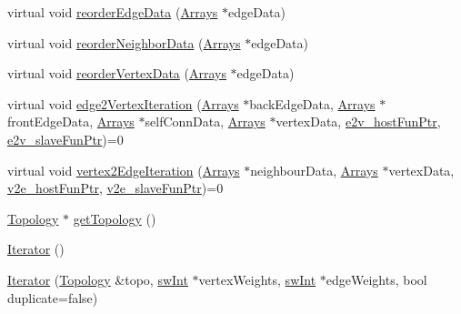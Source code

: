 \begin{DoxyCompactItemize}
\item 
virtual void \mbox{\hyperlink{classUNAT_1_1Iterator_a9272c47e4e6c7636366c720de203edb6}{reorder\+Edge\+Data}} (\mbox{\hyperlink{structArrays}{Arrays}} $\ast$edge\+Data)
\item 
virtual void \mbox{\hyperlink{classUNAT_1_1Iterator_a45d6064d872b297ff6b69f86bc7c54df}{reorder\+Neighbor\+Data}} (\mbox{\hyperlink{structArrays}{Arrays}} $\ast$edge\+Data)
\item 
virtual void \mbox{\hyperlink{classUNAT_1_1Iterator_a14c39cea873162b0232f55d73b0519ae}{reorder\+Vertex\+Data}} (\mbox{\hyperlink{structArrays}{Arrays}} $\ast$edge\+Data)
\item 
virtual void \mbox{\hyperlink{classUNAT_1_1Iterator_a59fb9d4c251dd0456078decabf332399}{edge2\+Vertex\+Iteration}} (\mbox{\hyperlink{structArrays}{Arrays}} $\ast$back\+Edge\+Data, \mbox{\hyperlink{structArrays}{Arrays}} $\ast$front\+Edge\+Data, \mbox{\hyperlink{structArrays}{Arrays}} $\ast$self\+Conn\+Data, \mbox{\hyperlink{structArrays}{Arrays}} $\ast$vertex\+Data, \mbox{\hyperlink{test_2directSegment_2iterator_8h_ae588e578b6781906a44208130df0ab29}{e2v\+\_\+host\+Fun\+Ptr}}, \mbox{\hyperlink{test_2directSegment_2iterator_8h_a7b58029f74760f3ca5384034c0e89c15}{e2v\+\_\+slave\+Fun\+Ptr}})=0
\item 
virtual void \mbox{\hyperlink{classUNAT_1_1Iterator_a0bb9f9c408c19b3c6bb342d37b333a1c}{vertex2\+Edge\+Iteration}} (\mbox{\hyperlink{structArrays}{Arrays}} $\ast$neighbour\+Data, \mbox{\hyperlink{structArrays}{Arrays}} $\ast$vertex\+Data, \mbox{\hyperlink{test_2directSegment_2iterator_8h_a15a4eedea7b94460153f0a0924c98224}{v2e\+\_\+host\+Fun\+Ptr}}, \mbox{\hyperlink{test_2directSegment_2iterator_8h_acd8809485e3b16adfce1d459f3372671}{v2e\+\_\+slave\+Fun\+Ptr}})=0
\item 
\mbox{\hyperlink{classUNAT_1_1Topology}{Topology}} $\ast$ \mbox{\hyperlink{classUNAT_1_1Iterator_a22ec6ca24e5c28053cbda5a1970fe86c}{get\+Topology}} ()
\item 
\mbox{\hyperlink{classUNAT_1_1Iterator_a3a341a86404dce424bc82e4a991ef29b}{Iterator}} ()
\item 
\mbox{\hyperlink{classUNAT_1_1Iterator_acc1365ff1a2078c14424624b75fe2c7e}{Iterator}} (\mbox{\hyperlink{classUNAT_1_1Topology}{Topology}} \&topo, \mbox{\hyperlink{include_2swMacro_8h_a113cf5f6b5377cdf3fac6aa4e443e9aa}{sw\+Int}} $\ast$vertex\+Weights, \mbox{\hyperlink{include_2swMacro_8h_a113cf5f6b5377cdf3fac6aa4e443e9aa}{sw\+Int}} $\ast$edge\+Weights, bool duplicate=false)
\item 

\end{DoxyCompactItemize}
